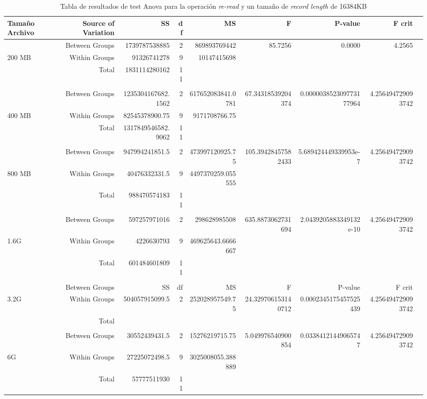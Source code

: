 \begin{landscape}
\begin{table}[!htp]\centering
\caption{Tabla de resultados de test Anova para la operación \textit{re-read} y un tamaño de \textit{record length} de 16384KB}\label{tab: }
\scriptsize
\begin{tabular}{lrrrrrrrr}\toprule
Tamaño Archivo &Source of Variation &SS &df &MS &F &P-value &F crit \\\midrule
&Between Groups &1739787538885 &2 &869893769442 &85.7256 &0.0000 &4.2565 \\
200 MB &Within Groups &91326741278 &9 &10147415698 & & & \\
&Total &1831114280162 &11 & & & & \\
& & & & & & & \\
&Between Groups &1235304167682.1562 &2 &617652083841.0781 &67.34318539204374 &0.000003852309773177964 &4.256494729093742 \\
400 MB &Within Groups &82545378900.75 &9 &9171708766.75 & & & \\
&Total &1317849546582.9062 &11 & & & & \\
& & & & & & & \\
&Between Groups &947994241851.5 &2 &473997120925.75 &105.39428457582433 &5.689424449339953e-7 &4.256494729093742 \\
800 MB &Within Groups &40476332331.5 &9 &4497370259.055555 & & & \\
&Total &988470574183 &11 & & & & \\
& & & & & & & \\
&Between Groups &597257971016 &2 &298628985508 &635.8873062731694 &2.0439205883349132e-10 &4.256494729093742 \\
1.6G &Within Groups &4226630793 &9 &469625643.6666667 & & & \\
&Total &601484601809 &11 & & & & \\
& & & & & & & \\
&Between Groups &SS &df &MS &F &P-value &F crit \\
3.2G &Within Groups &504057915099.5 &2 &252028957549.75 &24.329706153140712 &0.0002345175457525439 &4.256494729093742 \\
&Total & & & & & & \\
& & & & & & & \\
&Between Groups &30552439431.5 &2 &15276219715.75 &5.049976540900854 &0.03384121449065747 &4.256494729093742 \\
6G &Within Groups &27225072498.5 &9 &3025008055.388889 & & & \\
&Total &57777511930 &11 & & & & \\
\bottomrule
\end{tabular}
\end{table}
\end{landscape}

